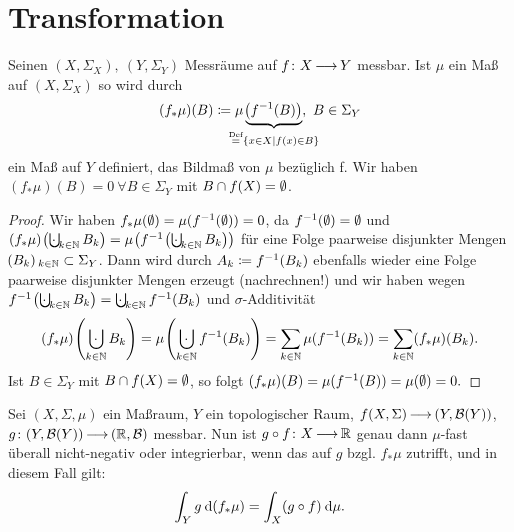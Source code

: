 \documentclass[skript.tex]{subfiles}
\begin{document}
	\section{Transformation}

	\begin{lem}[Bildmaß]
			Seinen $(X, \Sigma_X),\ (Y, \Sigma_Y)$ Messräume auf $f\colon X \kern -1pt \longrightarrow \kern -1pt Y$ messbar. Ist $\mu$ ein Maß auf $(X, \Sigma_X)$ so wird durch
			\[
				(f_* \mu)(B) \ceq \mu\underbrace{\pr{f^{-1} (B) }}_{\mathclap{\stackrel{\text{Def}}{=} \cbr{x\in X \mid f(x) \in B}}},\ B \in \Sigma_Y
			\]
			ein Maß auf $Y$ definiert, das \textup{Bildmaß von $\mu$ bezüglich f}. Wir haben $(f_* \mu)(B) = 0\ \forall B \in \Sigma_Y$ mit $B\cap f(X) = \emptyset$.
	\end{lem}
	
	\begin{proof}
			Wir haben $f_* \mu (\emptyset) = \mu(f^{-1}(\emptyset)) = 0$, da $f^{-1}(\emptyset) = \emptyset$ und \\ $(f_* \mu) \pr{\bigcupdot_{k\in\N} B_k} = \mu\pr{f^{-1} \pr{\bigcupdot_{k\in\N} B_k}} $ für eine Folge paarweise disjunkter Mengen\\ $\pr{B_k}_{k\in\N} \sbs \Sigma_Y$. Dann wird durch $A_k \coloneqq f^{-1} (B_k)$ ebenfalls wieder eine Folge paarweise disjunkter Mengen erzeugt (nachrechnen!) und wir haben wegen $f^{-1} \pr{\bigcupdot_{k\in\N} B_k }= \bigcupdot_{k\in\N} f^{-1} (B_k)$ und $\sigma$-Additivität
			\[
				(f_* \mu)\pr{\bigcupdot_{k\in\N} B_k} = \mu\pr{\bigcupdot_{k\in\N} f^{-1} (B_k) } = \sum_{k\in\N} \mu(f^{-1} (B_k)) = \sum_{k\in\N} (f_* \mu)(B_k).
			\]
			Ist $B \in \Sigma_Y$ mit $B\cap f(X)=\emptyset$, so folgt $(f_* \mu)(B) = \mu ( f^{-1} (B)) = \mu(\emptyset) = 0.$
	\end{proof}
	
	\begin{theorem}
		Sei $(X,\Sigma, \mu)$ ein Maßraum, $Y$ ein topologischer Raum, $f(X,\Sigma) \kern -1pt \longrightarrow \kern -1pt (Y, \mathcal{B}(Y))$,\\ $g\colon (Y, \mathcal{B}(Y)) \kern -1pt \longrightarrow \kern -1pt (\mathbb{R}, \mathcal{B})$ messbar. Nun ist $g \circ f\colon X \kern -1pt \longrightarrow \kern -1pt \mathbb{R}$ genau dann $\mu$-fast überall nicht-negativ oder integrierbar, wenn das auf $g$ bzgl. $f_* \mu$ zutrifft, und in diesem Fall gilt:
		\[
			\int_Y g \: \mathrm{d} (f_* \mu) = \int_X (g \circ f) \: \mathrm{d} \mu .
		\]
	\end{theorem}
	
\end{document}
